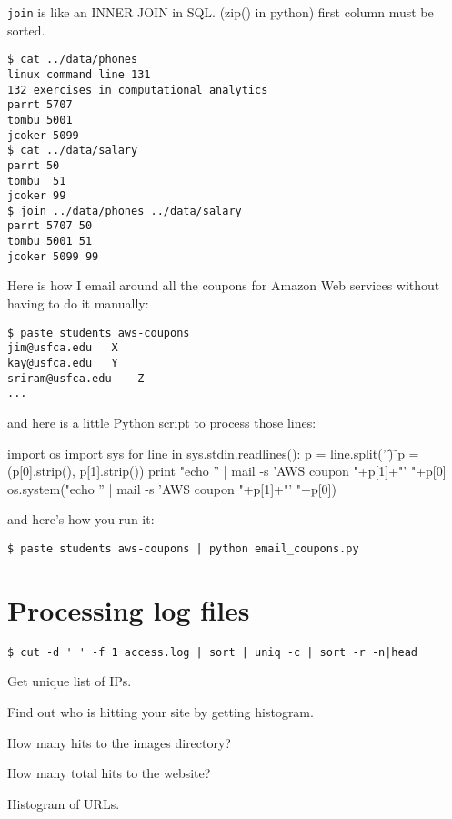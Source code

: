 \begin{fullwidth}
{\tt join} is like an INNER JOIN in SQL. (zip() in python) first column must be sorted.


\begin{lstlisting}[style=BashInputStyle]
$ cat ../data/phones
linux command line 131
132 exercises in computational analytics
parrt 5707
tombu 5001
jcoker 5099
$ cat ../data/salary
parrt 50
tombu  51
jcoker 99
$ join ../data/phones ../data/salary
parrt 5707 50
tombu 5001 51
jcoker 5099 99
\end{lstlisting}

Here is how I email around all the coupons for Amazon Web services without having to do it manually:

\begin{lstlisting}[style=BashInputStyle]
$ paste students aws-coupons
jim@usfca.edu	X
kay@usfca.edu	Y
sriram@usfca.edu	Z
...
\end{lstlisting}

and here is a little Python script to process those lines:

\begin{pyverbatim}
import os
import sys
for line in sys.stdin.readlines():
    p = line.split('\t')
    p = (p[0].strip(), p[1].strip())
    print "echo '' | mail -s 'AWS coupon "+p[1]+"' "+p[0]
    os.system("echo '' | mail -s 'AWS coupon "+p[1]+"' "+p[0])
\end{pyverbatim} 

and here's how you run it:
 
\begin{lstlisting}[style=BashInputStyle]
$ paste students aws-coupons | python email_coupons.py 
\end{lstlisting}

\section{Processing log files}

\begin{lstlisting}[style=BashInputStyle]
$ cut -d ' ' -f 1 access.log | sort | uniq -c | sort -r -n|head
\end{lstlisting}

Get unique list of IPs.

Find out who is hitting your site by getting histogram.

How many hits to the images directory? 

How many total hits to the website? 

Histogram of URLs.


\end{fullwidth}
